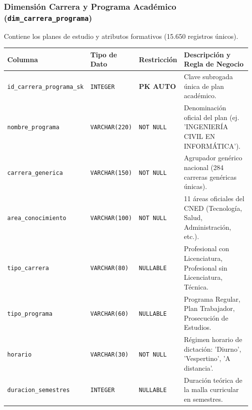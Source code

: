 \documentclass[11pt,a4paper]{article}
\begin{document}
\subsubsection{Dimensión Carrera y Programa Académico (\texttt{dim\_carrera\_programa})}
Contiene los planes de estudio y atributos formativos (15.650 registros únicos).
\begin{table}[h!]
\centering
\small
\begin{tabularx}{\textwidth}{lXlX}
\toprule
\textbf{Columna} & \textbf{Tipo de Dato} & \textbf{Restricción} & \textbf{Descripción y Regla de Negocio} \\
\midrule
\texttt{id\_carrera\_programa\_sk} & \texttt{INTEGER} & \textbf{PK AUTO} & Clave subrogada única de plan académico. \\
\texttt{nombre\_programa} & \texttt{VARCHAR(220)} & \texttt{NOT NULL} & Denominación oficial del plan (ej. 'INGENIERÍA CIVIL EN INFORMÁTICA'). \\
\texttt{carrera\_generica} & \texttt{VARCHAR(150)} & \texttt{NOT NULL} & Agrupador genérico nacional (284 carreras genéricas únicas). \\
\texttt{area\_conocimiento} & \texttt{VARCHAR(100)} & \texttt{NOT NULL} & 11 áreas oficiales del CNED (Tecnología, Salud, Administración, etc.). \\
\texttt{tipo\_carrera} & \texttt{VARCHAR(80)} & \texttt{NULLABLE} & Profesional con Licenciatura, Profesional sin Licenciatura, Técnica. \\
\texttt{tipo\_programa} & \texttt{VARCHAR(60)} & \texttt{NULLABLE} & Programa Regular, Plan Trabajador, Prosecución de Estudios. \\
\texttt{horario} & \texttt{VARCHAR(30)} & \texttt{NOT NULL} & Régimen horario de dictación: 'Diurno', 'Vespertino', 'A distancia'. \\
\texttt{duracion\_semestres} & \texttt{INTEGER} & \texttt{NULLABLE} & Duración teórica de la malla curricular en semestres. \\
\bottomrule
\end{tabularx}
\end{table}
\end{document}
